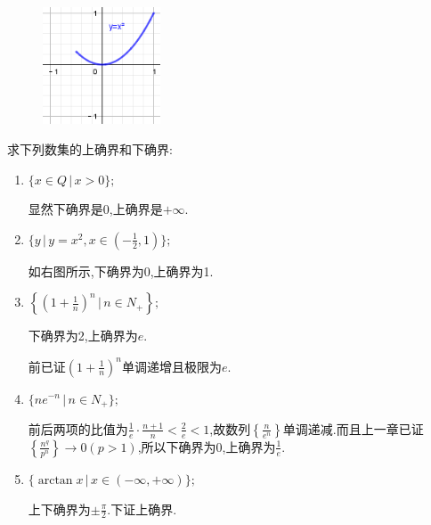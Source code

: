 \documentclass[cn,chinese,fontset]{elegantbook}
\begin{document}
            \begin{figure}
                \includegraphics[width=3.5cm]{图一.png}
                \caption{}
            \end{figure}
            \begin{exercise}
                求下列数集的上确界和下确界:
                \begin{enumerate}
                    \item $\{x\in Q\,\lvert\, x>0\};$
                    \begin{solution}
                        显然下确界是0,上确界是$+\infty$.
                    \end{solution}
                    \item $\{y\,\lvert\, y=x^2,x\in(-\frac{1}{2},1)\};$
                    \begin{solution}
                        如右图所示,下确界为0,上确界为1.
                    \end{solution}
                    \item $\left\{\left(1+\frac{1}{n}\right)^n \,\bigg\lvert\, n\in N_+\right\};$
                    \begin{solution}
                        下确界为2,上确界为$e$.
            
                        前已证$\left(1+\frac{1}{n}\right)^n$单调递增且极限为$e$.
                    \end{solution}
                    \item $\{ne^{-n}\,\lvert\, n\in N_+\};$
                    \begin{solution}
                        前后两项的比值为$\frac{1}{e}\cdot\frac{n+1}{n}<\frac{2}{e}<1$,故数列$\left\{\frac{n}{e^n}\right\}$单调递减.而且上一章已证$\left\{\frac{n^q}{p^n}\right\}\to 0(p>1)$,所以下确界为0,上确界为$\frac{1}{e}$.
                    \end{solution}
                    \item $\{\arctan x \,\lvert\, x\in (-\infty,+\infty)\};$
                    \begin{solution}
                        上下确界为$\pm \frac{\pi}{2}$.下证上确界.
            

\end{solution}
\end{enumerate}
\end{exercise}
\end{document}
